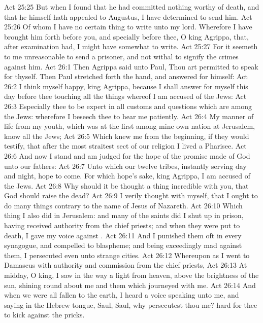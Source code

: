 \vs Act 25:25 But when I found that he had committed nothing worthy of death, and that he himself hath appealed to Augustus, I have determined to send him.
\vs Act 25:26 Of whom I have no certain thing to write unto my lord. Wherefore I have brought him forth before you, and specially before thee, O king Agrippa, that, after examination had, I might have somewhat to write.
\vs Act 25:27 For it seemeth to me unreasonable to send a prisoner, and not withal to signify the crimes  against him.
\vs Act 26:1 Then Agrippa said unto Paul, Thou art permitted to speak for thyself. Then Paul stretched forth the hand, and answered for himself:
\vs Act 26:2 I think myself happy, king Agrippa, because I shall answer for myself this day before thee touching all the things whereof I am accused of the Jews:
\vs Act 26:3 Especially  thee to be expert in all customs and questions which are among the Jews: wherefore I beseech thee to hear me patiently.
\vs Act 26:4 My manner of life from my youth, which was at the first among mine own nation at Jerusalem, know all the Jews;
\vs Act 26:5 Which knew me from the beginning, if they would testify, that after the most straitest sect of our religion I lived a Pharisee.
\vs Act 26:6 And now I stand and am judged for the hope of the promise made of God unto our fathers:
\vs Act 26:7 Unto which  our twelve tribes, instantly serving  day and night, hope to come. For which hope's sake, king Agrippa, I am accused of the Jews.
\vs Act 26:8 Why should it be thought a thing incredible with you, that God should raise the dead?
\vs Act 26:9 I verily thought with myself, that I ought to do many things contrary to the name of Jesus of Nazareth.
\vs Act 26:10 Which thing I also did in Jerusalem: and many of the saints did I shut up in prison, having received authority from the chief priests; and when they were put to death, I gave my voice against .
\vs Act 26:11 And I punished them oft in every synagogue, and compelled  to blaspheme; and being exceedingly mad against them, I persecuted  even unto strange cities.
\vs Act 26:12 Whereupon as I went to Damascus with authority and commission from the chief priests,
\vs Act 26:13 At midday, O king, I saw in the way a light from heaven, above the brightness of the sun, shining round about me and them which journeyed with me.
\vs Act 26:14 And when we were all fallen to the earth, I heard a voice speaking unto me, and saying in the Hebrew tongue, Saul, Saul, why persecutest thou me?  hard for thee to kick against the pricks.
